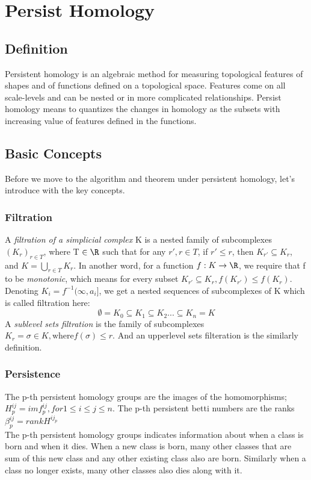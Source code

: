 \section{Persist Homology}

\subsection{Definition}
Persistent homology is an algebraic method for measuring topological features of shapes and of functions defined on a topological space. Features come on all scale-levels and can be nested or in more complicated relationships. Persist homology means to quantizes the changes in homology as the subsets with increasing value of features defined in the functions.


\subsection{Basic Concepts}
Before we move to the algorithm and theorem under persistent homology, let's introduce with the key concepts. 

\subsubsection{Filtration} A \textit{filtration of a simplicial complex} K is a nested family of subcomplexes $(K_r)_{r \in T}$, where T $\in \R $ such that for any $r', r \in T$, if $r' \leq r $, then $K_{r'} \subseteq K_r$, and $ K = \bigcup_{r \in T} K_r$. In another word, for a function $ f : K \rightarrow \R $, we require that f to be \textit{monotonic}, which means for every subset $K_{r'} \subseteq K_r, f(K_{r'}) 
\leq f(K_r)$. \\ 
Denoting $K_i = f^{-1}(\infty, a_i]$, we get a nested sequences of subcomplexes of K which is called filtration here:
\begin{equation*}
    \emptyset = K_0 \subseteq K_1 \subseteq K_2 ... \subseteq K_n = K
\end{equation*}
A \textit{sublevel sets filtration} is the family of subcomplexes $K_r = {\sigma \in K, \text{where} f(\sigma) \leq r}$. And an upperlevel sets filteration is the similarly definition. 

\subsubsection{Persistence}
The p-th persistent homology groups are the images of the homomorphisms; $H^{ij}_p = im f^{ij}_p, for 1 \leq i \leq j \leq n.$ The p-th persistent betti numbers are the ranks $\beta^{ij}_p = rank H^{ij_p}$\\ 
The p-th persistent homology groups indicates information about when a class is born and when it dies. When a new class is born, many other classes that are sum of this new class and any other existing class also are born. Similarly when a class no longer exists, many other classes also dies along with it.

